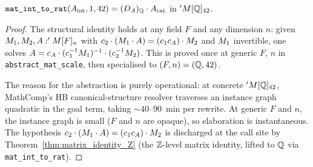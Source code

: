 \begin{lemma}
\label{lem:mat_A_scale_eq_Arat}
\rocqok
{}
$\texttt{mat\_int\_to\_rat}(A_{\mathrm{int}}, 1, 42) = (D_A)_{\mathbb{Q}} \cdot A_{\mathrm{rat}}$
in $'M[\mathbb{Q}]_{42}$.
\end{lemma}
\begin{proof}\rocqok
The structural identity holds at any field $F$ and any dimension $n$:
given $M_1, M_2, A : 'M[F]_n$ with $c_2 \cdot (M_1 \cdot A) = (c_1 c_A) \cdot M_2$
and $M_1$ invertible, one solves
$A = c_A \cdot (c_1^{-1} M_1)^{-1} \cdot (c_2^{-1} M_2)$.
This is proved once at generic $F$, $n$ in
\texttt{abstract\_mat\_scale}, then specialised to $(F, n) = (\mathbb{Q}, 42)$.

The reason for the abstraction is purely operational: at concrete
$'M[\mathbb{Q}]_{42}$, MathComp's HB canonical-structure resolver traverses
an instance graph quadratic in the goal term, taking ${\sim}40$--$90$~min
per rewrite. At generic $F$ and $n$, the instance graph is
small ($F$ and $n$ are opaque), so elaboration is instantaneous.
The hypothesis $c_2 \cdot (M_1 \cdot A) = (c_1 c_A) \cdot M_2$ is
discharged at the call site by Theorem~\ref{thm:matrix_identity_Z}
(the $\mathbb{Z}$-level matrix identity, lifted to $\mathbb{Q}$ via
\texttt{mat\_int\_to\_rat}).
\end{proof}

